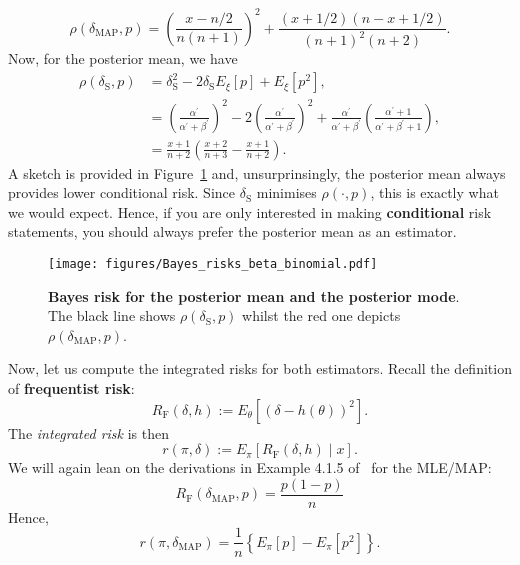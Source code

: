 \documentclass[a4paper,10pt, notitlepage]{report}
\begin{document}
{\begin{equation*}
 \rho(\delta_{\text{MAP}}, p) =  \left(\frac{x - n/2}{n(n+1)}\right)^2 +  \frac{(x + 1/2)(n - x + 1/2)}{(n + 1)^2(n+2)}.
\end{equation*}
Now, for the posterior mean, we have 
\begin{align*}
 \rho(\delta_{\text{S}}, p) &= \delta_{\text{S}}^2 - 2\delta_{\text{S}}E_\xi \left[p\right] + E_\xi \left[p^2 \right],\\
 &= \left(\frac{\alpha^\prime}{\alpha^\prime + \beta^\prime}\right)^2  - 2 \left(\frac{\alpha^\prime}{\alpha^\prime + \beta^\prime}\right)^2+ \frac{\alpha^\prime}{\alpha^\prime + \beta^\prime} \left(\frac{\alpha^\prime + 1}{\alpha^\prime + \beta^\prime + 1}\right),\\
 &= \frac{x+1}{n+2}\left(\frac{x+2}{n+3} - \frac{x+1}{n+2}\right).
\end{align*}
A sketch is provided in Figure~\ref{fig:Bayesrisks_q1} and, unsurprinsingly, the posterior mean always provides lower conditional risk.
Since $\delta_{\text{S}}$ minimises $\rho(\cdot, p)$, this is exactly what we would expect. 
Hence, if you are only interested in making \textbf{conditional} risk statements, you should always prefer the posterior mean as an estimator.
\begin{figure}[!ht]
\begin{center}
 \texttt{[image: figures/Bayes\_risks\_beta\_binomial.pdf]}
\end{center} 
\caption{\textbf{Bayes risk for the posterior mean and the posterior mode}.
The black line shows $\rho(\delta_{\text{S}}, p)$ whilst the red one depicts $\rho( \delta_{\text{MAP}}, p)$.
}
\label{fig:Bayesrisks_q1}
\end{figure}
Now, let us compute the integrated risks for both estimators.
Recall the definition of \textbf{frequentist risk}:
\begin{equation*}
 R_{\text{F}}(\delta, h) := E_\theta\left[(\delta-h(\theta))^2\right].
\end{equation*}
The \textit{integrated risk} is then
\begin{equation*}
 r(\pi, \delta) := E_\pi\left[R_{\text{F}}(\delta, h) \mid x \right].
\end{equation*}
We will again lean on the derivations in Example 4.1.5 of~\cite{Robert2007} for the MLE/MAP:
\begin{equation*}
 R_{\text{F}}(\delta_{\text{MAP}}, p) = \frac{p(1-p)}{n}
\end{equation*}
Hence, 
\begin{equation*}
 r(\pi, \delta_{\text{MAP}}) = \frac{1}{n} \left\{E_\pi[p] - E_\pi[p^2]\right\}.

\end{equation*}}
\end{document}
